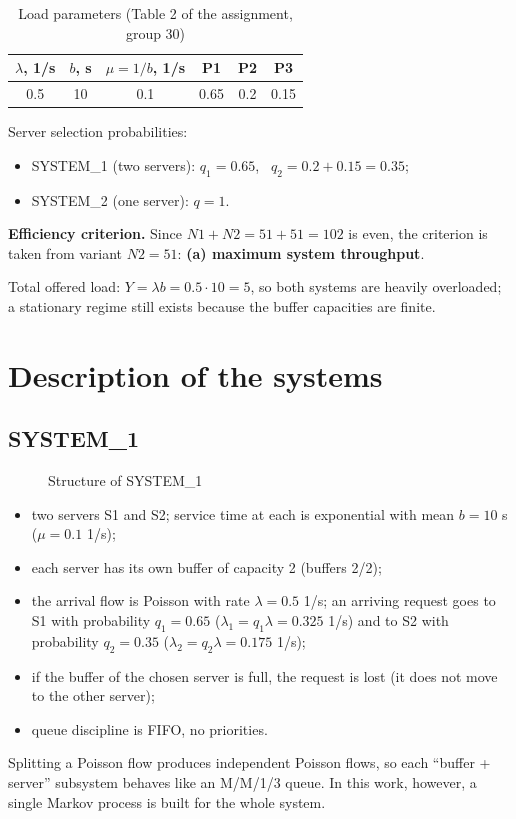 \documentclass[12pt,a4paper]{article}
\begin{document}
\begin{table}[H]
\centering
\caption{Load parameters (Table 2 of the assignment, group 30)}
\begin{tabular}{cccccc}
\toprule
$\lambda$, 1/s & $b$, s & $\mu=1/b$, 1/s & P1 & P2 & P3 \\
\midrule
0.5 & 10 & 0.1 & 0.65 & 0.2 & 0.15 \\
\bottomrule
\end{tabular}
\end{table}

Server selection probabilities:
\begin{itemize}
\item SYSTEM\_1 (two servers): $q_1 = 0.65$, \ $q_2 = 0.2 + 0.15 = 0.35$;
\item SYSTEM\_2 (one server): $q = 1$.
\end{itemize}

\textbf{Efficiency criterion.} Since $N1 + N2 = 51 + 51 = 102$ is even, the criterion is taken
from variant $N2 = 51$: \textbf{(a) maximum system throughput}.

Total offered load: $Y = \lambda b = 0.5\cdot 10 = 5$, so both systems are heavily overloaded;
a stationary regime still exists because the buffer capacities are finite.

\section{Description of the systems}
\subsection{SYSTEM\_1}
\begin{figure}[H]\centering\schemeOne\caption{Structure of SYSTEM\_1}\end{figure}
\begin{itemize}
\item two servers S1 and S2; service time at each is exponential with mean $b = 10$ s ($\mu = 0.1$ 1/s);
\item each server has its own buffer of capacity 2 (buffers 2/2);
\item the arrival flow is Poisson with rate $\lambda = 0.5$ 1/s; an arriving request goes to S1 with probability $q_1 = 0.65$ ($\lambda_1 = q_1\lambda = 0.325$ 1/s) and to S2 with probability $q_2 = 0.35$ ($\lambda_2 = q_2\lambda = 0.175$ 1/s);
\item if the buffer of the chosen server is full, the request is lost (it does not move to the other server);
\item queue discipline is FIFO, no priorities.
\end{itemize}
Splitting a Poisson flow produces independent Poisson flows, so each ``buffer + server'' subsystem behaves
like an M/M/1/3 queue. In this work, however, a single Markov process is built for the whole system.
\end{document}

